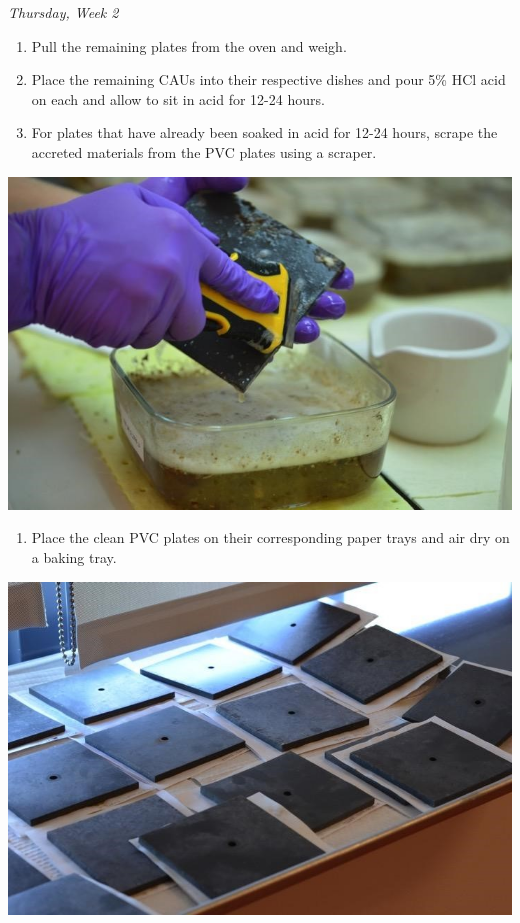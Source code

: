 \documentclass[
]{book}
\providecommand{\tightlist}{%
  \setlength{\itemsep}{0pt}\setlength{\parskip}{0pt}}
\begin{document}
\emph{Thursday, Week 2}

\begin{enumerate}
\def\labelenumi{\arabic{enumi}.}
\tightlist
\item
  Pull the remaining plates from the oven and weigh.
\item
  Place the remaining CAUs into their respective dishes and pour 5\% HCl acid on each and allow to sit in acid for 12-24 hours.
\item
  For plates that have already been soaked in acid for 12-24 hours, scrape the accreted materials from the PVC plates using a scraper.
\end{enumerate}

\includegraphics{images/DailyTasks9.jpg}

\begin{enumerate}
\def\labelenumi{\arabic{enumi}.}
\setcounter{enumi}{3}
\tightlist
\item
  Place the clean PVC plates on their corresponding paper trays and air dry on a baking tray.
\end{enumerate}

\includegraphics{images/DailyTasks10.jpg}
\end{document}
